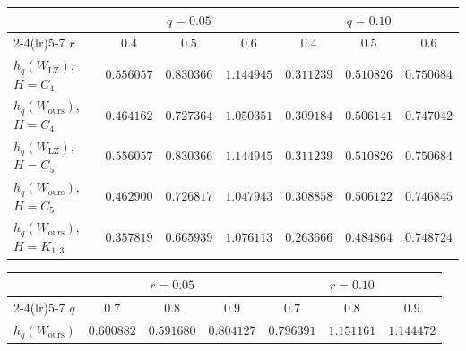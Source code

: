 \documentclass{article}
\theoremstyle{plain}
\theoremstyle{definition}
\theoremstyle{remark}
\begin{document}
\begin{table}[t]
  \centering
  {\small
  \begin{tabular}{lcccccc}
    \toprule
    & \multicolumn{3}{c}{$q=0.05$} & \multicolumn{3}{c}{$q=0.10$} \\
    \cmidrule(lr){2-4}\cmidrule(lr){5-7}
    $r$ & $0.4$ & $0.5$ & $0.6$ & $0.4$ & $0.5$ & $0.6$ \\
    \midrule
    $h_q(W_{\mathrm{LZ}})$, $H=C_4$    & $0.556057$ & $0.830366$ & $1.144945$ & $0.311239$ & $0.510826$ & $0.750684$ \\
    $h_q(W_{\mathrm{ours}})$, $H=C_4$  & $0.464162$ & $0.727364$ & $1.050351$ & $0.309184$ & $0.506141$ & $0.747042$ \\
    \midrule
    $h_q(W_{\mathrm{LZ}})$, $H=C_5$    & $0.556057$ & $0.830366$ & $1.144945$ & $0.311239$ & $0.510826$ & $0.750684$ \\
    $h_q(W_{\mathrm{ours}})$, $H=C_5$  & $0.462900$ & $0.726817$ & $1.047943$ & $0.308858$ & $0.506122$ & $0.746845$ \\
    \midrule
    $h_q(W_{\mathrm{ours}})$, $H=K_{1,3}$    & $0.357819$ & $0.665939$ & $1.076113$ & $0.263666$ & $0.484864$ & $0.748724$ \\
    \bottomrule
  \end{tabular}
  }
\end{table}


\begin{table}[t]
  \centering
  {\small
  \begin{tabular}{lcccccc}
    \toprule
    & \multicolumn{3}{c}{$r=0.05$} & \multicolumn{3}{c}{$r=0.10$} \\
    \cmidrule(lr){2-4}\cmidrule(lr){5-7}
    $q$ & $0.7$ & $0.8$ & $0.9$ & $0.7$ & $0.8$ & $0.9$ \\
    \midrule
    $h_q(W_{\mathrm{ours}})$  & $0.600882$ & $0.591680$ & $0.804127$ & $0.796391$ & $1.151161$ & $1.144472$ \\
    \bottomrule
  \end{tabular}
  }
\end{table}
\end{document}
